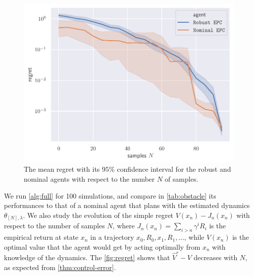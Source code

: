 \documentclass{article}
\begin{document}
\begin{figure}[tp]
	\centering
	\includegraphics[width=0.8\linewidth]{img/regret.pdf}
	\caption{The mean regret with its $95\%$ confidence interval for the robust and nominal agents with respect to the number $N$ of samples.}
	\label{fig:regret}
\end{figure}

We run \autoref{alg:full} for 100 simulations, and compare in \autoref{tab:obstacle} its performances to that of a nominal agent that plans with the estimated dynamics $\theta_{[N],\lambda}$. We also study the evolution of the simple regret $V(x_n) - J_n(x_n)$ with respect to the number of samples $N$, where $J_n(x_n) = \sum_{i > n} \gamma^i R_i$ is the empirical return at state $x_n$ in a trajectory $x_0, R_0, x_1, R_1, \dots$, while $V(x_n)$ is the optimal value that the agent would get by acting optimally from $x_n$ with knowledge of the dynamics. The \autoref{fig:regret} shows that $\hat{V}^r - V$ decreases with $N$, as expected from \autoref{thm:control-error}.
\end{document}
